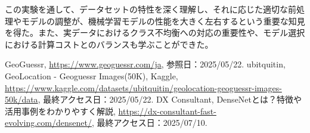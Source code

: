 \documentclass[a4paper, 11pt, titlepage]{jsarticle}
\begin{document}
この実験を通して、データセットの特性を深く理解し、それに応じた適切な前処理やモデルの調整が、機械学習モデルの性能を大きく左右するという重要な知見を得た。また、実データにおけるクラス不均衡への対応の重要性や、モデル選択における計算コストとのバランスも学ぶことができた。

\begin{thebibliography}{n}
GeoGuessr, \url{https://www.geoguessr.com/ja}, 参照日：2025/05/22.
ubitquitin, GeoLocation - Geoguessr Images(50K), Kaggle, \url{https://www.kaggle.com/datasets/ubitquitin/geolocation-geoguessr-images-50k/data}, 最終アクセス日：2025/05/22.
DX Consultant, DenseNetとは？特徴や活用事例をわかりやすく解説, \url{https://dx-consultant-fast-evolving.com/densenet/}, 最終アクセス日：2025/07/10.
\end{thebibliography}
\end{document}
